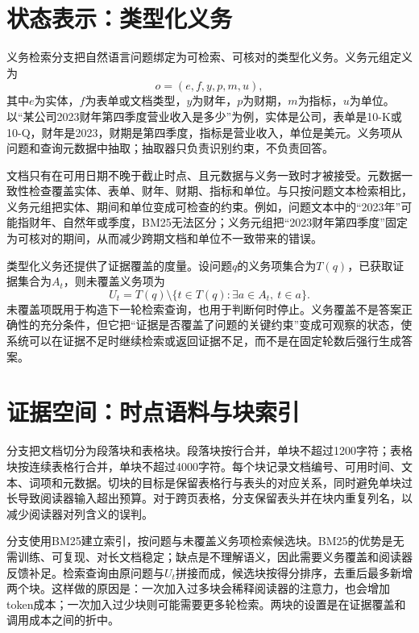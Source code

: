 \section{状态表示：类型化义务}

义务检索分支把自然语言问题绑定为可检索、可核对的类型化义务。义务元组定义为
\begin{equation}
o=(e,f,y,p,m,u),
\end{equation}
其中$e$为实体，$f$为表单或文档类型，$y$为财年，$p$为财期，$m$为指标，$u$为单位。以“某公司2023财年第四季度营业收入是多少”为例，实体是公司，表单是10-K或10-Q，财年是2023，财期是第四季度，指标是营业收入，单位是美元。义务项从问题和查询元数据中抽取；抽取器只负责识别约束，不负责回答。

文档只有在可用日期不晚于截止时点、且元数据与义务一致时才被接受。元数据一致性检查覆盖实体、表单、财年、财期、指标和单位。与只按问题文本检索相比，义务元组把实体、期间和单位变成可检查的约束。例如，问题文本中的“2023年”可能指财年、自然年或季度，BM25无法区分；义务元组把“2023财年第四季度”固定为可核对的期间，从而减少跨期文档和单位不一致带来的错误。

类型化义务还提供了证据覆盖的度量。设问题$q$的义务项集合为$T(q)$，已获取证据集合为$A_t$，则未覆盖义务项为
\begin{equation}
U_t=T(q)\setminus\{t\in T(q):\exists a\in A_t,\ t\in a\}.
\end{equation}
未覆盖项既用于构造下一轮检索查询，也用于判断何时停止。义务覆盖不是答案正确性的充分条件，但它把“证据是否覆盖了问题的关键约束”变成可观察的状态，使系统可以在证据不足时继续检索或返回证据不足，而不是在固定轮数后强行生成答案。

\section{证据空间：时点语料与块索引}

分支把文档切分为段落块和表格块。段落块按行合并，单块不超过1200字符；表格块按连续表格行合并，单块不超过4000字符。每个块记录文档编号、可用时间、文本、词项和元数据。切块的目标是保留表格行与表头的对应关系，同时避免单块过长导致阅读器输入超出预算。对于跨页表格，分支保留表头并在块内重复列名，以减少阅读器对列含义的误判。

分支使用BM25建立索引，按问题与未覆盖义务项检索候选块。BM25的优势是无需训练、可复现、对长文档稳定；缺点是不理解语义，因此需要义务覆盖和阅读器反馈补足。检索查询由原问题与$U_t$拼接而成，候选块按得分排序，去重后最多新增两个块。这样做的原因是：一次加入过多块会稀释阅读器的注意力，也会增加token成本；一次加入过少块则可能需要更多轮检索。两块的设置是在证据覆盖和调用成本之间的折中。

